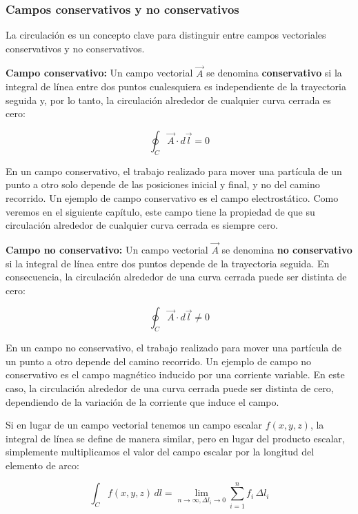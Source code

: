 \documentclass{article}
\begin{document}
\subsubsection{Campos conservativos y no conservativos}

La circulación es un concepto clave para distinguir entre campos vectoriales conservativos y no conservativos.

\textbf{Campo conservativo:} Un campo vectorial $\vec{A}$ se denomina \textbf{conservativo} si la integral de línea entre dos puntos cualesquiera es independiente de la trayectoria seguida y, por lo tanto, la circulación alrededor de cualquier curva cerrada es cero:

\begin{equation}
\oint_C \vec{A} \cdot d\vec{l} = 0
\end{equation}

En un campo conservativo, el trabajo realizado para mover una partícula de un punto a otro solo depende de las posiciones inicial y final, y no del camino recorrido. Un ejemplo de campo conservativo es el campo electrostático. Como veremos en el siguiente capítulo, este campo tiene la propiedad de que su circulación alrededor de cualquier curva cerrada es siempre cero.

\textbf{Campo no conservativo:} Un campo vectorial $\vec{A}$ se denomina \textbf{no conservativo} si la integral de línea entre dos puntos depende de la trayectoria seguida. En consecuencia, la circulación alrededor de una curva cerrada puede ser distinta de cero:

\begin{equation}
\oint_C \vec{A} \cdot d\vec{l} \neq 0
\end{equation}

En un campo no conservativo, el trabajo realizado para mover una partícula de un punto a otro depende del camino recorrido. Un ejemplo de campo no conservativo es el campo magnético inducido por una corriente variable. En este caso, la circulación alrededor de una curva cerrada puede ser distinta de cero, dependiendo de la variación de la corriente que induce el campo.

Si en lugar de un campo vectorial tenemos un campo escalar $f(x,y,z)$, la integral de línea se define de manera similar, pero en lugar del producto escalar, simplemente multiplicamos el valor del campo escalar por la longitud del elemento de arco:

\[
\int_C f(x, y, z) \, dl = \lim_{n \to \infty, \Delta l_i \to 0} \sum_{i=1}^n f_i \, \Delta l_i
\]
\end{document}
